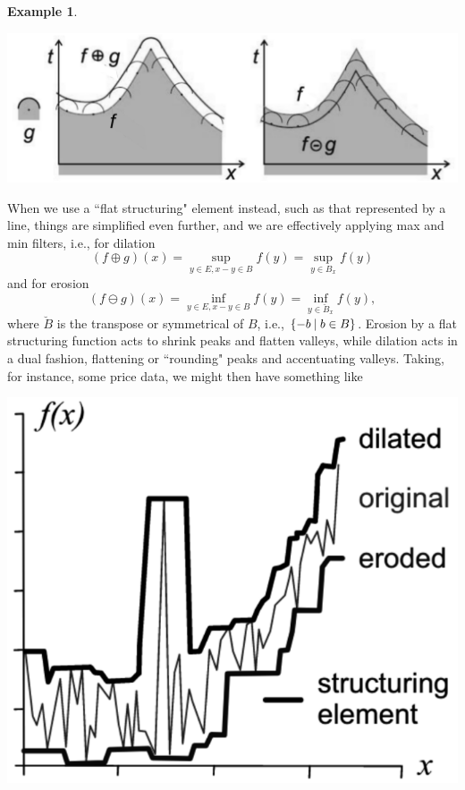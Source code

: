\documentclass[11pt]{book}
\theoremstyle{definition}
\newtheorem{example}{Example}[section]
\theoremstyle{definition}
\theoremstyle{definition}
\theoremstyle{theorem}
\theoremstyle{definition}
\begin{document}
\begin{example}
\begin{center}
	\includegraphics*[scale=0.25]{FunctionalDilationErosion.png}
\end{center}
When we use a ``flat structuring" element instead, such as that represented by a line, things are simplified even further, and we are effectively applying max and min filters, i.e., for dilation
\begin{equation*}
(f \oplus g)(x) = \sup_{y \in E, x-y \in B} f(y) = \sup_{y \in B_x} f(y) 
\end{equation*}
and for erosion 
\begin{equation*}
(f \ominus g)(x) = \inf_{y \in E, x-y \in B} f(y) = \inf_{y \in \breve{B}_x} f(y), 
\end{equation*}
where $\breve{B}$ is the transpose or symmetrical of $B$, i.e., $\{-b \hspace*{0.25em}|\hspace*{0.25em} b \in B\}$. Erosion by a flat structuring function acts to shrink peaks and flatten valleys, while dilation acts in a dual fashion, flattening or ``rounding" peaks and accentuating valleys. Taking, for instance, some price data, we might then have something like 
\begin{center}
	\includegraphics*[scale=0.25]{DilationPlusErosionStock.png}

\end{center}
\end{example}
\end{document}
